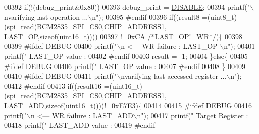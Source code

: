 \begin{DoxyCode}
{{{{{{{{{{{{{{{{{{{00392 \textcolor{preprocessor}{}     \textcolor{keywordflow}{if}(!(debug\_print&0x80))
00393      debug\_print = \hyperlink{a00037_a99496f7308834e8b220f7894efa0b6ab}{DISABLE};
00394        printf(\textcolor{stringliteral}{"\(\backslash\)nvarifying last operation  ...\(\backslash\)n"});
00395 \textcolor{preprocessor}{     #endif}
00396 \textcolor{preprocessor}{}     \textcolor{keywordflow}{if}((result8 =(uint8\_t)(\hyperlink{a00007_ga7ad9f65ee46aca507374096506a0b1c4}{spi\_read}(BCM2835\_SPI\_CS0,\hyperlink{a00037_a94de2b046db6e10257ef4481c0a15eaa}{CHIP\_ADDRESS1},
      \hyperlink{a00036_aed1301248abf6c26045727a190f6550a}{LAST\_OP},\textcolor{keyword}{sizeof}(uint16\_t))))
00397      !=0xCA \textcolor{comment}{/*LAST\_OP!=WR*/})\{
00398              
00399 \textcolor{preprocessor}{     #ifdef DEBUG}
00400 \textcolor{preprocessor}{}       printf(\textcolor{stringliteral}{"\(\backslash\)n                                               <---  WR failure : LAST\_OP \(\backslash\)n"});
00401        printf(\textcolor{stringliteral}{"        LAST\_OP value  :%
00402 \textcolor{preprocessor}{     #endif}
00403 \textcolor{preprocessor}{}     result = -1;
00404      \}\textcolor{keywordflow}{else}\{
00405 \textcolor{preprocessor}{      #ifdef DEBUG}
00406 \textcolor{preprocessor}{}       printf(\textcolor{stringliteral}{"        LAST\_OP value  :%
00407 \textcolor{preprocessor}{     #endif}
00408 \textcolor{preprocessor}{}     \}
00409      
00410 \textcolor{preprocessor}{     #ifdef DEBUG}
00411 \textcolor{preprocessor}{}       printf(\textcolor{stringliteral}{"\(\backslash\)nvarifying last accessed register  ...\(\backslash\)n"});
00412 \textcolor{preprocessor}{     #endif}
00413 \textcolor{preprocessor}{}     \textcolor{keywordflow}{if}((result16 =(uint16\_t)(\hyperlink{a00007_ga7ad9f65ee46aca507374096506a0b1c4}{spi\_read}(BCM2835\_SPI\_CS0,\hyperlink{a00037_a94de2b046db6e10257ef4481c0a15eaa}{CHIP\_ADDRESS1},
      \hyperlink{a00036_adab6c053c389db762442c88b7e32e543}{LAST\_ADD},\textcolor{keyword}{sizeof}(uint16\_t))))!=0xE7E3)\{
00414              
00415 \textcolor{preprocessor}{     #ifdef DEBUG}
00416 \textcolor{preprocessor}{}       printf(\textcolor{stringliteral}{"\(\backslash\)n                                               <---  WR failure : LAST\_ADD\(\backslash\)n"});
00417        printf(\textcolor{stringliteral}{"        Target Register :%
00418        printf(\textcolor{stringliteral}{"        LAST\_ADD value  :%
00419 \textcolor{preprocessor}{     #endif}
}}}}}}}}}}}}}}}}}}}}}}}
\end{DoxyCode}
